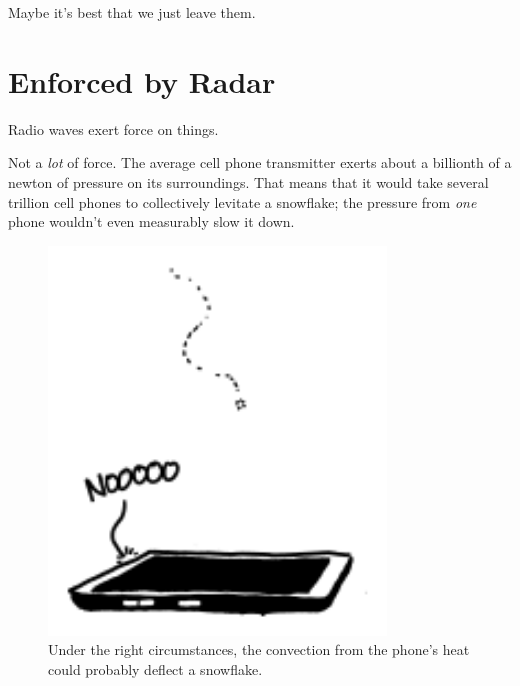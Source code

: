 {{Maybe it's best that we just leave them.}

{
\chapter{Enforced by Radar}
}

\hfill{}

{Radio waves exert force on things.}

{Not a \emph{lot} of force. The average cell phone transmitter exerts about a billionth of a newton of pressure on its surroundings. That means that it would take several trillion cell phones to collectively levitate a snowflake; the pressure from \emph{one} phone wouldn't even measurably slow it down.}

\begin{figure}[!htbp]
\centering
\includegraphics[scale=0.5, max width=0.8\textwidth]{imgs/a/87/radar_snowflake.png}
\caption{Under the right circumstances, the convection from the phone's heat could probably deflect a snowflake.}
\end{figure}

}
